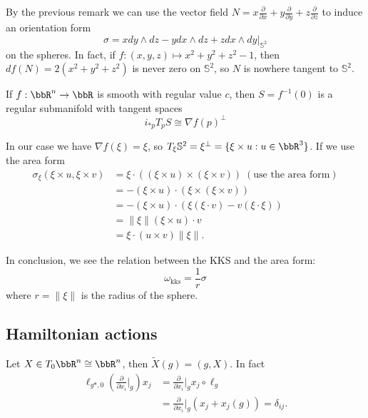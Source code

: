 \begin{itemize}
    By the previous remark we can use the vector field 
    $N= x\tfrac{\partial}{\partial x}+y\tfrac{\partial}{\partial y}+z\tfrac{\partial}{\partial z}$ to induce 
    an orientation form 
    \begin{equation}
        \sigma = xdy\wedge dz - ydx\wedge dz+zdx\wedge dy \big|_{\mathbb{S}^2}
    \end{equation}
    on the spheres. In fact, if $f:(x,y,z)\mapsto x^2+y^2+z^2-1$, then $df(N)=2(x^2+y^2+z^2)$ is never zero on $\mathbb{S}^2$, so 
    $N$ is nowhere tangent to $\mathbb{S}^2$.\par 

    \begin{dang}
        \begin{remark}
            If $f:\bbR^n\to\bbR$ is smooth with regular value $c$, then $S=f^{-1}(0)$ is a regular submanifold 
            with tangent spaces 
            \begin{equation}
                i_{*p}T_pS \cong \nabla f(p)^\perp
            \end{equation}
        \end{remark}
    \end{dang}

    In our case we have $\nabla f(\xi) = \xi$, so $T_\xi\mathbb{S}^2=\xi^\perp=\{\xi\times u:u\in\bbR^3\}$. If we 
    use the area form 
    \begin{equation}
        \begin{split}
            \sigma_\xi(\xi\times u,\xi\times v) &=\xi\cdot ((\xi\times u)\times (\xi\times v))\;(\text{use the area form})\\
            &=-(\xi\times u)\cdot (\xi\times(\xi\times v))\\
            &=-(\xi\times u)\cdot (\xi(\xi\cdot v)-v(\xi\cdot\xi))\\
            &=\|\xi\| (\xi\times u)\cdot v \\
            &=\xi\cdot (u\times v)\|\xi\|.
        \end{split}
    \end{equation}

    In conclusion, we see the relation between the KKS and the area form:
    \begin{equation}
        \omega_{\text{kks}}=\frac{1}{r}\sigma
    \end{equation}
    where $r=\|\xi\|$ is the radius of the sphere.
\end{itemize}

\subsection{Hamiltonian actions}
Let $X\in T_0\bbR^n\cong \bbR^n$, then $\widetilde{X}(g)=(g,X)$. In fact
\begin{equation}
    \begin{split}
         \ell_{g*,0}(\frac{\partial}{\partial x_i}\bigg|_g)x_j &= \frac{\partial}{\partial x_i}\bigg|_g x_j\circ \ell_g\\
         &=\frac{\partial}{\partial x_i}\bigg|_g(x_j+x_j(g))=\delta_{ij}.
    \end{split}
\end{equation}


